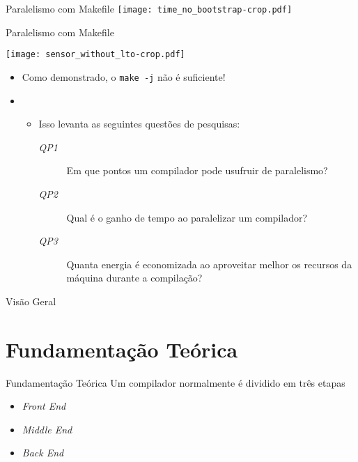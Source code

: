 \begin{frame}
    Paralelismo com Makefile
    \texttt{[image: time\_no\_bootstrap-crop.pdf]}
    \label{fig:analysis_classical}
\end{frame}

\begin{frame}
    Paralelismo com Makefile

    \centering
    \texttt{[image: sensor\_without\_lto-crop.pdf]}
    \label{fig:analysis_classical}
\end{frame}

\begin{frame}
    \begin{itemize}
        \item Como demonstrado, o \texttt{make -j} não é suficiente!
        \item[]
        \begin{itemize}
            \item Isso levanta as seguintes questões de pesquisas:
            \begin{description}
                \item[\textit{QP1}] Em que pontos um compilador pode usufruir de paralelismo?
                \item[\textit{QP2}] Qual é o ganho de tempo ao paralelizar um compilador?
                \item[\textit{QP3}] Quanta energia é economizada ao aproveitar melhor os recursos da máquina durante a compilação?
            \end{description}
        \end{itemize}
    \end{itemize}
\end{frame}



\begin{frame}{Visão Geral}
  \overview
\end{frame}

\section{Fundamentação Teórica}

\begin{frame}{Fundamentação Teórica}
  Um compilador normalmente é dividido em três etapas
  \begin{itemize}
    \item \textit{Front End}
    \item \textit{Middle End}
    \item \textit{Back End}
  \end{itemize}
\end{frame}


